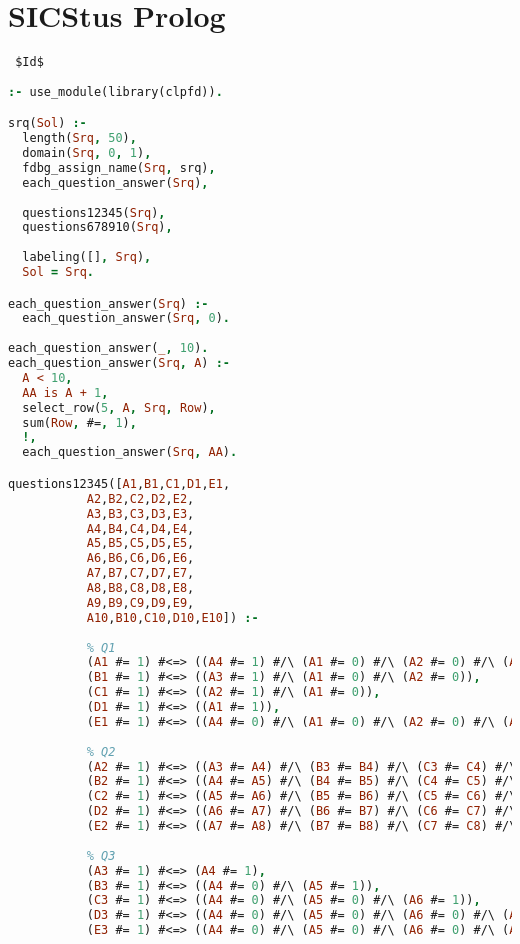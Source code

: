 \section{SICStus Prolog}
\label{implementation:sicstus}
\verb= $Id$ =

\begin{lstlisting}[language=Prolog]
:- use_module(library(clpfd)).

srq(Sol) :-
  length(Srq, 50),
  domain(Srq, 0, 1),
  fdbg_assign_name(Srq, srq),
  each_question_answer(Srq),
  
  questions12345(Srq),
  questions678910(Srq),
  
  labeling([], Srq),
  Sol = Srq.

each_question_answer(Srq) :-
  each_question_answer(Srq, 0).
  
each_question_answer(_, 10).
each_question_answer(Srq, A) :-
  A < 10,
  AA is A + 1,
  select_row(5, A, Srq, Row),
  sum(Row, #=, 1),
  !,
  each_question_answer(Srq, AA).

questions12345([A1,B1,C1,D1,E1,
           A2,B2,C2,D2,E2,
           A3,B3,C3,D3,E3,
           A4,B4,C4,D4,E4,
           A5,B5,C5,D5,E5,
           A6,B6,C6,D6,E6,
           A7,B7,C7,D7,E7,
           A8,B8,C8,D8,E8,
           A9,B9,C9,D9,E9,
           A10,B10,C10,D10,E10]) :-
           
           % Q1
           (A1 #= 1) #<=> ((A4 #= 1) #/\ (A1 #= 0) #/\ (A2 #= 0) #/\ (A3 #= 0)),
           (B1 #= 1) #<=> ((A3 #= 1) #/\ (A1 #= 0) #/\ (A2 #= 0)),
           (C1 #= 1) #<=> ((A2 #= 1) #/\ (A1 #= 0)),
           (D1 #= 1) #<=> ((A1 #= 1)),
           (E1 #= 1) #<=> ((A4 #= 0) #/\ (A1 #= 0) #/\ (A2 #= 0) #/\ (A3 #= 0)),
           
           % Q2
           (A2 #= 1) #<=> ((A3 #= A4) #/\ (B3 #= B4) #/\ (C3 #= C4) #/\ (D3 #= D4) #/\ (E3 #= E4)),
           (B2 #= 1) #<=> ((A4 #= A5) #/\ (B4 #= B5) #/\ (C4 #= C5) #/\ (D4 #= D5) #/\ (E4 #= E5)),
           (C2 #= 1) #<=> ((A5 #= A6) #/\ (B5 #= B6) #/\ (C5 #= C6) #/\ (D5 #= D6) #/\ (E5 #= E6)),
           (D2 #= 1) #<=> ((A6 #= A7) #/\ (B6 #= B7) #/\ (C6 #= C7) #/\ (D6 #= D7) #/\ (E6 #= E7)),
           (E2 #= 1) #<=> ((A7 #= A8) #/\ (B7 #= B8) #/\ (C7 #= C8) #/\ (D7 #= D8) #/\ (E7 #= E8)),
           
           % Q3
           (A3 #= 1) #<=> (A4 #= 1),
           (B3 #= 1) #<=> ((A4 #= 0) #/\ (A5 #= 1)),
           (C3 #= 1) #<=> ((A4 #= 0) #/\ (A5 #= 0) #/\ (A6 #= 1)),
           (D3 #= 1) #<=> ((A4 #= 0) #/\ (A5 #= 0) #/\ (A6 #= 0) #/\ (A7 #= 1)),
           (E3 #= 1) #<=> ((A4 #= 0) #/\ (A5 #= 0) #/\ (A6 #= 0) #/\ (A7 #= 0) #/\ (A8 #= 1)),
           

\end{lstlisting}
